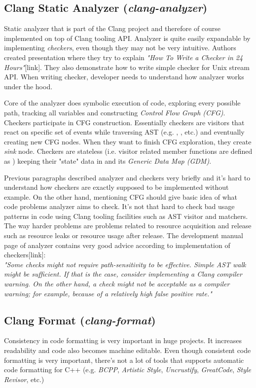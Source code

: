 \subsection{Clang Static Analyzer (\emph{clang-analyzer})}
Static analyzer that is part of the Clang project and therefore of course implemented on top of Clang tooling API. Analyzer is quite easily expandable by implementing \emph{checkers}, even though they may not be very intuitive. Authors created presentation where they try to explain \emph{"How To Write a Checker in 24 Hours"}[link]. They also demonstrate how to write simple checker for  Unix stream API. When writing checker, developer needs to understand how analyzer works under the hood.

Core of the analyzer does symbolic execution of code, exploring every possible path, tracking all variables and constructing \emph{Control Flow Graph (CFG)}. Checkers participate in CFG construction. Essentially checkers are visitors that react on specific set of events while traversing AST (e.g. , , etc.) and eventually creating new CFG nodes. When they want to finish CFG exploration, they create \emph{sink} node. Checkers are stateless (i.e. visitor related member functions are defined as ) keeping their "state" data in  and its \emph{Generic Data Map (GDM)}.

Previous paragraphs described analyzer and checkers very briefly and it's hard to understand how checkers are exactly supposed to be implemented without example. On the other hand, mentioning CFG should give basic idea of what code problems analyzer aims to check. It's not that hard to check bad usage patterns in code using Clang tooling facilities such as AST visitor and matchers. The way harder problems are problems related to resource acquisition and release such as resource leaks or resource usage after release. The development manual page of analyzer contains very good advice according to implementation of checkers[link]:\\

\label{clang-analyzer-checkers}
\emph{"Some checks might not require path-sensitivity to be effective. Simple AST walk might be sufficient. If that is the case, consider implementing a Clang compiler warning. On the other hand, a check might not be acceptable as a compiler warning; for example, because of a relatively high false positive rate."}

\subsection{Clang Format (\emph{clang-format})}
Consistency in code formatting is very important in huge projects. It increases readability and code also becomes machine editable. Even though consistent code formatting is very important, there's not a lot of tools that supports automatic code formatting for C++ (e.g. \textit{BCPP}, \textit{Artistic Style}, \textit{Uncrustify}, \textit{GreatCode}, \emph{Style Revisor}, etc.)

